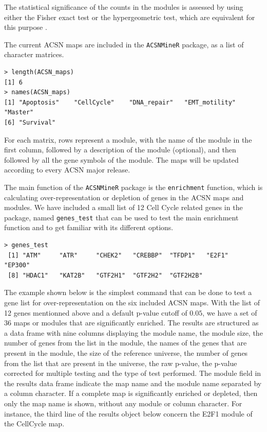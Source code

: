 \documentclass{article}
\begin{document}
The statistical significance of the counts in the modules is assessed by using
either the Fisher exact test \cite{fisher1922interpretation,
fisher1934statistical} or the hypergeometric test, which are equivalent for this
purpose \cite{rivals2007enrichment}.

The current ACSN maps are included in the \verb|ACSNMineR| package, as a list of character matrices.

\begin{verbatim}
> length(ACSN_maps)
[1] 6
> names(ACSN_maps)
[1] "Apoptosis"    "CellCycle"    "DNA_repair"   "EMT_motility" "Master" 
[6] "Survival"    
\end{verbatim}

For each matrix, rows represent a module, with the name of the module in the
first column, followed by a description of the module (optional), and then
followed by all the gene symbols of the module. The maps will be updated
according to every ACSN major release.

The main function of the \verb|ACSNMineR| package is the \verb|enrichment|
function, which is calculating over-representation or depletion of genes in the
ACSN maps and modules. We have included a small list of 12 Cell Cycle related
genes in the package, named \verb|genes_test| that can be used to test the main
enrichment function and to get familiar with its different options.

\begin{verbatim}
> genes_test
 [1] "ATM"     "ATR"     "CHEK2"   "CREBBP"  "TFDP1"   "E2F1"    "EP300"  
 [8] "HDAC1"   "KAT2B"   "GTF2H1"  "GTF2H2"  "GTF2H2B"
\end{verbatim}

The example shown below is the simplest command that can be done to test a gene
list for over-representation on the six included ACSN maps. With the list of 12
genes mentionned above and a default p-value cutoff of $0.05$, we have a set of
36 maps or modules that are significantly enriched. The results are structured
as a data frame with nine columns displaying the module name, the module size,
the number of genes from the list in the module, the names of the genes that are
present in the module, the size of the reference universe, the number of genes
from the list that are present in the universe, the raw p-value, the p-value
corrected for multiple testing and the type of test performed. The module field
in the results data frame indicate the map name and the module name separated by
a column character. If a complete map is significantly enriched or depleted,
then only the map name is shown, without any module or column character. For
instance, the third line of the results object below concern the E2F1 module of
the CellCycle map. 
\end{document}
